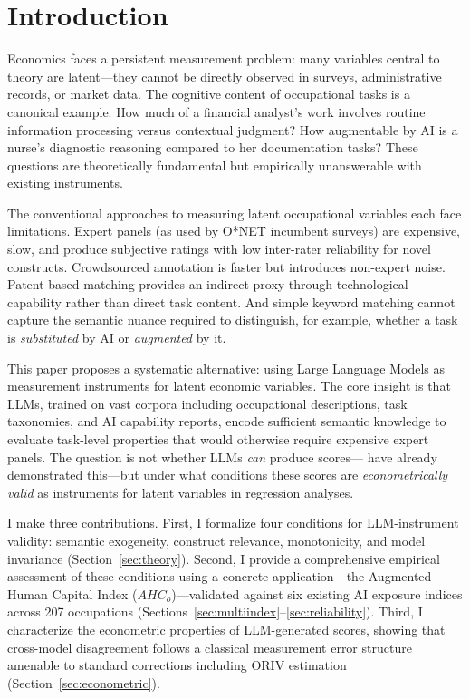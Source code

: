 \documentclass[11pt,a4paper]{article}
\theoremstyle{definition}
\begin{document}
\section{Introduction}
\label{sec:intro}

Economics faces a persistent measurement problem: many variables central to theory are latent---they cannot be directly observed in surveys, administrative records, or market data. The cognitive content of occupational tasks is a canonical example. How much of a financial analyst's work involves routine information processing versus contextual judgment? How augmentable by AI is a nurse's diagnostic reasoning compared to her documentation tasks? These questions are theoretically fundamental but empirically unanswerable with existing instruments.

The conventional approaches to measuring latent occupational variables each face limitations. Expert panels (as used by O*NET incumbent surveys) are expensive, slow, and produce subjective ratings with low inter-rater reliability for novel constructs. Crowdsourced annotation \citep{felten2021occupational} is faster but introduces non-expert noise. Patent-based matching \citep{webb2020impact} provides an indirect proxy through technological capability rather than direct task content. And simple keyword matching cannot capture the semantic nuance required to distinguish, for example, whether a task is \textit{substituted} by AI or \textit{augmented} by it.

This paper proposes a systematic alternative: using Large Language Models as measurement instruments for latent economic variables. The core insight is that LLMs, trained on vast corpora including occupational descriptions, task taxonomies, and AI capability reports, encode sufficient semantic knowledge to evaluate task-level properties that would otherwise require expensive expert panels. The question is not whether LLMs \textit{can} produce scores---\citet{eloundou2024gpts} have already demonstrated this---but under what conditions these scores are \textit{econometrically valid} as instruments for latent variables in regression analyses.

I make three contributions. First, I formalize four conditions for LLM-instrument validity: semantic exogeneity, construct relevance, monotonicity, and model invariance (Section~\ref{sec:theory}). Second, I provide a comprehensive empirical assessment of these conditions using a concrete application---the Augmented Human Capital Index ($AHC_o$)---validated against six existing AI exposure indices across 207 occupations (Sections~\ref{sec:multiindex}--\ref{sec:reliability}). Third, I characterize the econometric properties of LLM-generated scores, showing that cross-model disagreement follows a classical measurement error structure amenable to standard corrections including ORIV estimation (Section~\ref{sec:econometric}).
\end{document}
